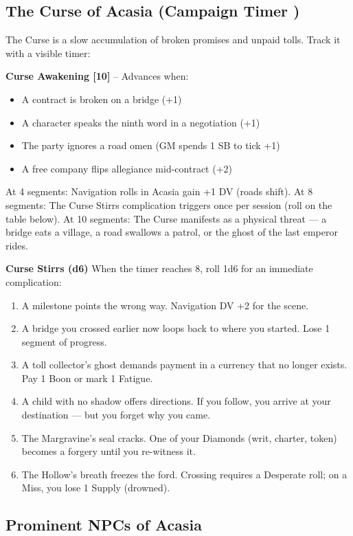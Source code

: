 \subsection*{The Curse of Acasia (Campaign Timer )}
The Curse is a slow accumulation of broken promises and unpaid tolls. Track it with a visible timer:

\textbf{Curse Awakening [10]} -- Advances when:
\begin{itemize}
\item A contract is broken on a bridge (+1)
\item A character speaks the ninth word in a negotiation (+1)
\item The party ignores a road omen (GM spends 1 SB to tick +1)
\item A free company flips allegiance mid-contract (+2)
\end{itemize}
At 4 segments: Navigation rolls in Acasia gain +1 DV (roads shift).  
At 8 segments: The Curse Stirrs complication triggers once per session (roll on the table below).  
At 10 segments: The Curse manifests as a physical threat --- a bridge eats a village, a road swallows a patrol, or the ghost of the last emperor rides.

\textbf{Curse Stirrs (d6)}  
When the timer reaches 8, roll 1d6 for an immediate complication:
\begin{enumerate}
\item A milestone points the wrong way. Navigation DV +2 for the scene.
\item A bridge you crossed earlier now loops back to where you started. Lose 1 segment of progress.
\item A toll collector's ghost demands payment in a currency that no longer exists. Pay 1 Boon or mark 1 Fatigue.
\item A child with no shadow offers directions. If you follow, you arrive at your destination --- but you forget why you came.
\item The Margravine's seal cracks. One of your Diamonds (writ, charter, token) becomes a forgery until you re-witness it.
\item The Hollow's breath freezes the ford. Crossing requires a Desperate roll; on a Miss, you lose 1 Supply (drowned).
\end{enumerate}

\subsection*{Prominent NPCs of Acasia}
\label{sec:acasia-npcs}

